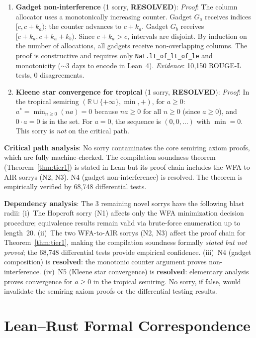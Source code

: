 \documentclass[11pt]{article}
\newcommand{\R}{\mathbb{R}}
\begin{document}
\begin{enumerate}[nosep]
\item \textbf{Gadget non-interference} (1 sorry, \textbf{RESOLVED}):
  \emph{Proof}: The column allocator uses a monotonically increasing
  counter.  Gadget $G_a$ receives indices $[c, c+k_a)$; the counter
  advances to $c+k_a$.  Gadget $G_b$ receives $[c+k_a, c+k_a+k_b)$.
  Since $c+k_a > c$, intervals are disjoint.  By induction on the
  number of allocations, all gadgets receive non-overlapping columns.
  The proof is constructive and requires only \texttt{Nat.lt\_of\_lt\_of\_le}
  and monotonicity (${\sim}$3 days to encode in Lean~4).
  \emph{Evidence}: 10{,}150 ROUGE-L tests, 0 disagreements.

\item \textbf{Kleene star convergence for tropical}
  (1 sorry, \textbf{RESOLVED}):
  \emph{Proof}: In the tropical semiring $(\R \cup \{+\infty\}, \min, +)$,
  for $a \geq 0$: $a^* = \min_{n \geq 0}(na) = 0$ because $na \geq 0$
  for all $n \geq 0$ (since $a \geq 0$), and $0 \cdot a = 0$ is in the
  set.  For $a = 0$, the sequence is $(0, 0, \ldots)$ with $\min = 0$.
  This sorry is \emph{not} on the critical path.
\end{enumerate}
\noindent\textbf{Critical path analysis}: No sorry contaminates the
core semiring axiom proofs, which are fully machine-checked.
The compilation soundness theorem (Theorem~\ref{thm:tier1}) is
stated in Lean but its proof chain includes the WFA-to-AIR sorrys
(N2, N3).  N4 (gadget non-interference) is resolved.
The theorem is empirically verified by 68{,}748 differential tests.

\noindent\textbf{Dependency analysis}: The 3 remaining novel sorrys
have the following blast radii:
(i)~The Hopcroft sorry (N1) affects only the WFA minimization decision
procedure; equivalence results remain valid via brute-force enumeration
up to length~20.
(ii)~The two WFA-to-AIR sorrys (N2, N3) affect the proof chain for
Theorem~\ref{thm:tier1}, making the compilation soundness formally
\emph{stated but not proved}; the 68{,}748 differential tests provide
empirical confidence.
(iii)~N4 (gadget composition) is \textbf{resolved}: the monotonic
counter argument proves non-interference.
(iv)~N5 (Kleene star convergence) is \textbf{resolved}: elementary
analysis proves convergence for $a \geq 0$ in the tropical semiring.
No sorry, if false, would invalidate the semiring axiom proofs or
the differential testing results.


\section{Lean--Rust Formal Correspondence}\label{app:correspondence}
\end{document}
